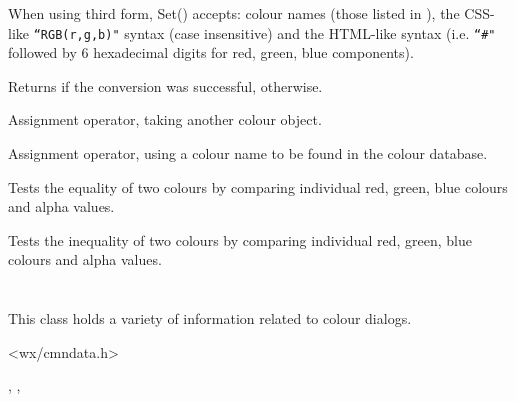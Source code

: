 When using third form, Set() accepts: colour names (those listed in ), the CSS-like \texttt{``RGB(r,g,b)"} syntax (case insensitive) and the HTML-like syntax (i.e. \texttt{``\#"} followed by 6 hexadecimal digits for red, green, blue components).

Returns \true if the conversion was successful, \false otherwise.



\label{wxcolourassign}


Assignment operator, taking another colour object.


Assignment operator, using a colour name to be found in the colour database.




\label{wxcolourequality}


Tests the equality of two colours by comparing individual red, green, blue colours and alpha values.


\label{wxcolourinequality}


Tests the inequality of two colours by comparing individual red, green, blue colours and alpha values.

\section{}\label{wxcolourdata}

This class holds a variety of information related to colour dialogs.




<wx/cmndata.h>


, , 

